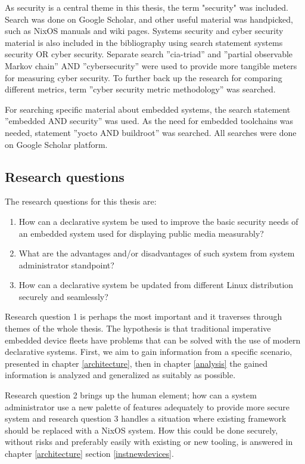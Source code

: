 As security is a central theme in this thesis, the term "security" was included. Search was done on Google Scholar, and other useful material was handpicked, such as NixOS manuals and wiki pages. Systems security and cyber security material is also included in the bibliography using search statement systems security OR cyber security. Separate search ''cia-triad'' and ''partial observable Markov chain'' AND ''cybersecurity'' were used to provide more tangible meters for measuring cyber security. To further back up the research for comparing different metrics, term ''cyber security metric methodology'' was searched.

For searching specific material about embedded systems, the search statement ''embedded AND security'' was used. As the need for embedded toolchains was needed, statement ''yocto AND buildroot'' was searched. All searches were done on Google Scholar platform.


\subsection{Research questions} \label{resquest}

The research questions for this thesis are:

\begin{enumerate}
\item How can a declarative system be used to improve the basic security needs of an embedded system used for displaying public media measurably?
\item What are the advantages and/or disadvantages of such system from system administrator standpoint?
\item How can a declarative system be updated from different Linux distribution securely and seamlessly?
\end{enumerate}

Research question 1 is perhaps the most important and it traverses through themes of the whole thesis. The hypothesis is that traditional imperative embedded device fleets have problems that can be solved with the use of modern declarative systems. First, we aim to gain information from a specific scenario, presented in chapter \ref{architecture}, then in chapter \ref{analysis} the gained information is analyzed and generalized as suitably as possible. 

Research question 2 brings up the human element; how can a system administrator use a new palette of features adequately to provide more secure system and research question 3 handles a situation where existing framework should be replaced with a NixOS system. How this could be done securely, without risks and preferably easily with existing or new tooling, is answered in chapter \ref{architecture} section \ref{instnewdevices}.

